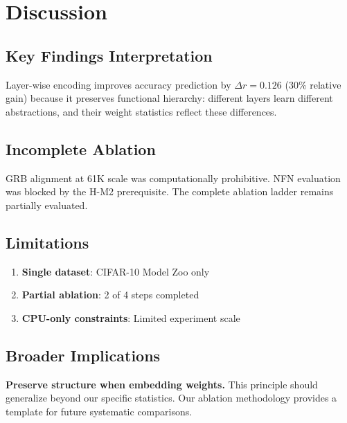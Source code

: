 \section{Discussion}
\label{sec:discussion}

\subsection{Key Findings Interpretation}

Layer-wise encoding improves accuracy prediction by $\Delta r = 0.126$ (30\% relative gain) because it preserves functional hierarchy: different layers learn different abstractions, and their weight statistics reflect these differences.

\subsection{Incomplete Ablation}

GRB alignment at 61K scale was computationally prohibitive. NFN evaluation was blocked by the H-M2 prerequisite. The complete ablation ladder remains partially evaluated.

\subsection{Limitations}

\begin{enumerate}
    \item \textbf{Single dataset}: CIFAR-10 Model Zoo only
    \item \textbf{Partial ablation}: 2 of 4 steps completed
    \item \textbf{CPU-only constraints}: Limited experiment scale
\end{enumerate}

\subsection{Broader Implications}

\textbf{Preserve structure when embedding weights.} This principle should generalize beyond our specific statistics. Our ablation methodology provides a template for future systematic comparisons.
